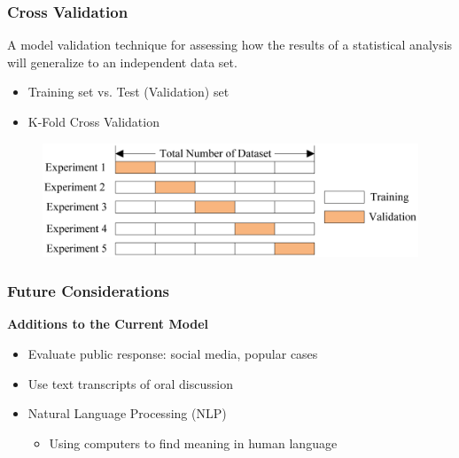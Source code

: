 \documentclass{beamer}
\begin{document}
\begin{frame}
\frametitle{Cross Validation}

\begin{definition} 
A model validation technique for assessing how the results of a statistical analysis will generalize to an independent data set.
\end{definition}

\begin{itemize}
	\item Training set vs. Test (Validation) set
	\item K-Fold Cross Validation
\end{itemize}

\begin{figure}[h]
\begin{center}
\includegraphics[width=0.9\columnwidth]{kfold}
\end{center}
\end{figure}




\end{frame}


\begin{frame}[fragile] %
\frametitle{Future Considerations}
\textbf{Additions to the Current Model}
\begin{itemize}
	\item Evaluate public response: social media, popular cases
	\item Use text transcripts of oral discussion
	\item Natural Language Processing (NLP)
	\begin{itemize}
		\item Using computers to find meaning in human language
	\end{itemize}
\end{itemize}


\end{frame}
\end{document}
